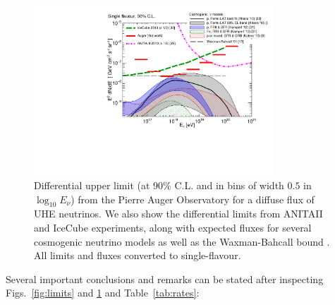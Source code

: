 \documentclass[reprint,showpacs,showkeys,amsmath,amssymb,aps,nofootinbib]{revtex4-1}
\begin{document}
\begin{figure}[!t]
\centering
\includegraphics[width=9.0cm]{./diff_limits_and_models_paper_combined_all.pdf}
\vskip -3mm
\caption{ 
Differential upper limit (at 90$\%$ C.L.
and in bins of width $0.5$ in $\log_{10}E_\nu$)
from the Pierre Auger Observatory 
for a diffuse flux of UHE neutrinos. 
We also show the differential limits from ANITAII \cite{ANITAII} 
and IceCube \cite{IceCube_latest_limit} experiments,
along with expected fluxes for several cosmogenic neutrino models \cite{Ahlers_GZK,Kampert_GZK,Kotera_GZK}
as well as the Waxman-Bahcall bound \cite{WB}.
All limits and fluxes converted to single-flavour.
}
\label{fig:limits2}
\end{figure}


Several important conclusions and remarks can be stated
after inspecting Figs.~\ref{fig:limits} and \ref{fig:limits2} and Table~\ref{tab:rates}:
\end{document}
